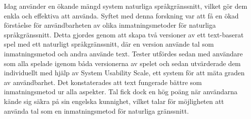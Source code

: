 Idag använder en ökande mängd system naturliga språkgränssnitt, vilket gör dem enkla och effektiva att använda. Syftet med denna forskning var att få en ökad förståelse för användbarheten av olika inmatningsmetoder för naturliga språkgränssnitt. Detta gjordes genom att skapa två versioner av ett text-baserat spel med ett naturligt språkgränssnitt, där en version använde tal som inmatningsmetod och andra använde text. Tester utfördes sedan med användare som alla spelade igenom båda versionerna av spelet och sedan utvärderade dem individuellt med hjälp av System Usability Scale, ett system för att mäta graden av användbarhet. Det konstaterades att text fungerade bättre som inmatningsmetod ur alla aspekter. Tal fick dock en hög poäng när användarna kände sig säkra på sin engelska kunnighet, vilket talar för möjligheten att använda tal som en inmatningsmetod för naturliga gränssnitt.